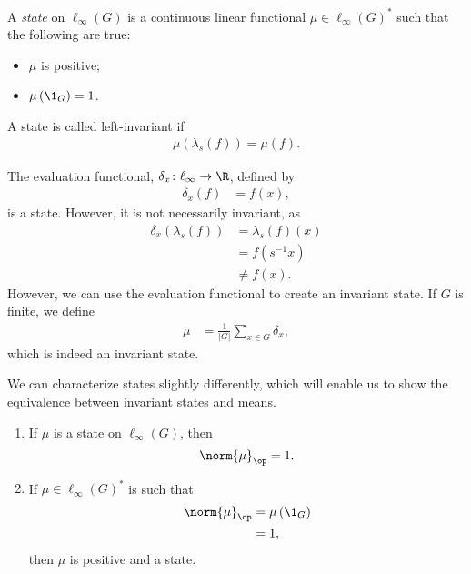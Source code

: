 \documentclass[10pt]{mypackage2}
\begin{document}
\begin{definition}
  A \textit{state} on $\ell_{\infty}\left(G\right)$ is a continuous linear functional $\mu\in \ell_{\infty}\left(G\right)^{\ast}$ such that the following are true:
  \begin{itemize}
    \item $\mu$ is positive;
    \item $\mu\left(\1_{G}\right) = 1$.
  \end{itemize}
  A state is called left-invariant if
  \begin{align*}
    \mu\left(\lambda_s\left(f\right)\right) = \mu\left(f\right).
  \end{align*}
\end{definition}
\begin{example}\label{ex:finite_invariant_state}
  The evaluation functional, $\delta_x\colon \ell_{\infty}\rightarrow \R$, defined by
  \begin{align*}
    \delta_{x}\left(f\right) &= f(x),
  \end{align*}
  is a state. However, it is not necessarily invariant, as
  \begin{align*}
    \delta_x\left(\lambda_s\left(f\right)\right) &= \lambda_s\left(f\right)\left(x\right)\\
                                                 &= f\left(s^{-1}x\right)\\
                                                 &\neq f(x).
  \end{align*}
  However, we can use the evaluation functional to create an invariant state. If $G$ is finite, we define
  \begin{align*}
    \mu &= \frac{1}{\left\vert G \right\vert} \sum_{x\in G}\delta_x,
  \end{align*}
  which is indeed an invariant state.
\end{example}
We can characterize states slightly differently, which will enable us to show the equivalence between invariant states and means.
\begin{lemma}\label{lemma:characterizing_states}\hfill
  \begin{enumerate}[(1)]
    \item If $\mu$ is a state on $\ell_{\infty}\left(G\right)$, then
      \begin{align*}
        \norm{\mu}_{\op} = 1.
      \end{align*}
    \item If $\mu\in \ell_{\infty}\left(G\right)^{\ast}$ is such that
      \begin{align*}
        \norm{\mu}_{\op} &= \mu\left(\1_{G}\right)\\
                               &= 1,
      \end{align*}
      then $\mu$ is positive and a state.
  \end{enumerate}
\end{lemma}
\end{document}
